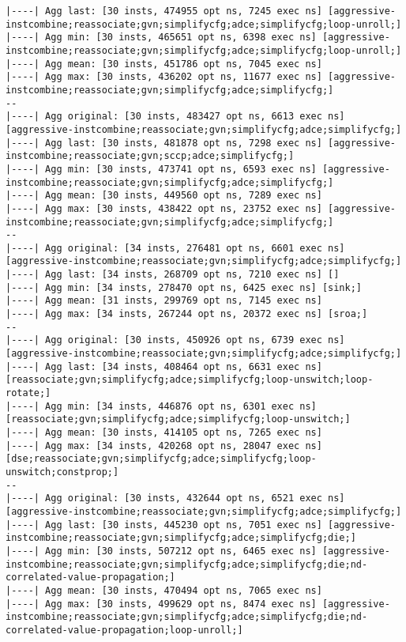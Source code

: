 \documentclass{vldb}
\newcommand{\dbCode}[1]{{\sffamily\small \textbf{#1}}\xspace}
\begin{document}
\begin{lstlisting}[caption={Results of Query \dbCode{INSERT INTO foo VALUES (1)} with Expert Optimizations},label={lst:simpleexpertopt}]
|----| Agg last: [30 insts, 474955 opt ns, 7245 exec ns] [aggressive-instcombine;reassociate;gvn;simplifycfg;adce;simplifycfg;loop-unroll;]
|----| Agg min: [30 insts, 465651 opt ns, 6398 exec ns] [aggressive-instcombine;reassociate;gvn;simplifycfg;adce;simplifycfg;loop-unroll;]
|----| Agg mean: [30 insts, 451786 opt ns, 7045 exec ns]
|----| Agg max: [30 insts, 436202 opt ns, 11677 exec ns] [aggressive-instcombine;reassociate;gvn;simplifycfg;adce;simplifycfg;]
--
|----| Agg original: [30 insts, 483427 opt ns, 6613 exec ns] [aggressive-instcombine;reassociate;gvn;simplifycfg;adce;simplifycfg;]
|----| Agg last: [30 insts, 481878 opt ns, 7298 exec ns] [aggressive-instcombine;reassociate;gvn;sccp;adce;simplifycfg;]
|----| Agg min: [30 insts, 473741 opt ns, 6593 exec ns] [aggressive-instcombine;reassociate;gvn;simplifycfg;adce;simplifycfg;]
|----| Agg mean: [30 insts, 449560 opt ns, 7289 exec ns]
|----| Agg max: [30 insts, 438422 opt ns, 23752 exec ns] [aggressive-instcombine;reassociate;gvn;simplifycfg;adce;simplifycfg;]
--
|----| Agg original: [34 insts, 276481 opt ns, 6601 exec ns] [aggressive-instcombine;reassociate;gvn;simplifycfg;adce;simplifycfg;]
|----| Agg last: [34 insts, 268709 opt ns, 7210 exec ns] []
|----| Agg min: [34 insts, 278470 opt ns, 6425 exec ns] [sink;]
|----| Agg mean: [31 insts, 299769 opt ns, 7145 exec ns]
|----| Agg max: [34 insts, 267244 opt ns, 20372 exec ns] [sroa;]
--
|----| Agg original: [30 insts, 450926 opt ns, 6739 exec ns] [aggressive-instcombine;reassociate;gvn;simplifycfg;adce;simplifycfg;]
|----| Agg last: [34 insts, 408464 opt ns, 6631 exec ns] [reassociate;gvn;simplifycfg;adce;simplifycfg;loop-unswitch;loop-rotate;]
|----| Agg min: [34 insts, 446876 opt ns, 6301 exec ns] [reassociate;gvn;simplifycfg;adce;simplifycfg;loop-unswitch;]
|----| Agg mean: [30 insts, 414105 opt ns, 7265 exec ns]
|----| Agg max: [34 insts, 420268 opt ns, 28047 exec ns] [dse;reassociate;gvn;simplifycfg;adce;simplifycfg;loop-unswitch;constprop;]
--
|----| Agg original: [30 insts, 432644 opt ns, 6521 exec ns] [aggressive-instcombine;reassociate;gvn;simplifycfg;adce;simplifycfg;]
|----| Agg last: [30 insts, 445230 opt ns, 7051 exec ns] [aggressive-instcombine;reassociate;gvn;simplifycfg;adce;simplifycfg;die;]
|----| Agg min: [30 insts, 507212 opt ns, 6465 exec ns] [aggressive-instcombine;reassociate;gvn;simplifycfg;adce;simplifycfg;die;nd-correlated-value-propagation;]
|----| Agg mean: [30 insts, 470494 opt ns, 7065 exec ns]
|----| Agg max: [30 insts, 499629 opt ns, 8474 exec ns] [aggressive-instcombine;reassociate;gvn;simplifycfg;adce;simplifycfg;die;nd-correlated-value-propagation;loop-unroll;]

\end{lstlisting}
\end{document}
